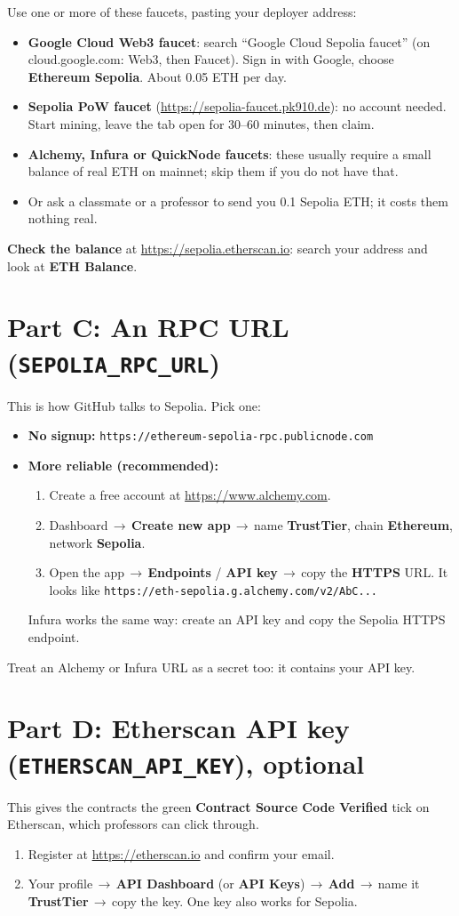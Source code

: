 \documentclass[11pt,a4paper]{article}
\newcommand{\ui}[1]{\textsf{\textbf{#1}}}
\newcommand{\code}[1]{\texttt{#1}}
\newcommand{\arr}{\,$\rightarrow$\,}
\begin{document}
Use one or more of these faucets, pasting your deployer address:
\begin{itemize}
  \item \textbf{Google Cloud Web3 faucet}: search ``Google Cloud Sepolia faucet'' (on cloud.google.com: Web3, then Faucet). Sign in with Google, choose \ui{Ethereum Sepolia}. About 0.05 ETH per day.
  \item \textbf{Sepolia PoW faucet} (\url{https://sepolia-faucet.pk910.de}): no account needed. Start mining, leave the tab open for 30--60 minutes, then claim.
  \item \textbf{Alchemy, Infura or QuickNode faucets}: these usually require a small balance of real ETH on mainnet; skip them if you do not have that.
  \item Or ask a classmate or a professor to send you 0.1 Sepolia ETH; it costs them nothing real.
\end{itemize}
\textbf{Check the balance} at \url{https://sepolia.etherscan.io}: search your address and look at \ui{ETH Balance}.

\section{Part C: An RPC URL (\code{SEPOLIA\_RPC\_URL})}
This is how GitHub talks to Sepolia. Pick one:
\begin{itemize}
  \item \textbf{No signup:} \nolinkurl{https://ethereum-sepolia-rpc.publicnode.com}
  \item \textbf{More reliable (recommended):}
  \begin{enumerate}
    \item Create a free account at \url{https://www.alchemy.com}.
    \item Dashboard\arr\ui{Create new app}\arr name \ui{TrustTier}, chain \ui{Ethereum}, network \ui{Sepolia}.
    \item Open the app\arr\ui{Endpoints} / \ui{API key}\arr copy the \textbf{HTTPS} URL. It looks like \nolinkurl{https://eth-sepolia.g.alchemy.com/v2/AbC...}
  \end{enumerate}
  Infura works the same way: create an API key and copy the Sepolia HTTPS endpoint.
\end{itemize}
{\small Treat an Alchemy or Infura URL as a secret too: it contains your API key.}

\section{Part D: Etherscan API key (\code{ETHERSCAN\_API\_KEY}), optional}
This gives the contracts the green \ui{Contract Source Code Verified} tick on Etherscan, which professors can click through.
\begin{enumerate}
  \item Register at \url{https://etherscan.io} and confirm your email.
  \item Your profile\arr\ui{API Dashboard} (or \ui{API Keys})\arr\ui{Add}\arr name it \ui{TrustTier}\arr copy the key. One key also works for Sepolia.
\end{enumerate}
\end{document}
